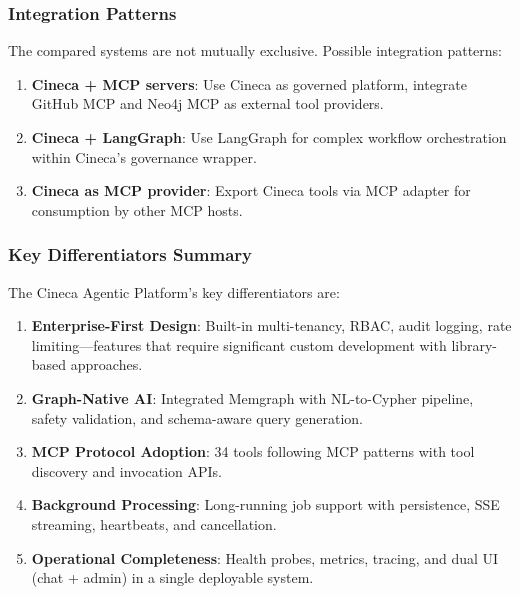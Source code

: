 \subsubsection{Integration Patterns}

The compared systems are not mutually exclusive. Possible integration patterns:

\begin{enumerate}
    \item \textbf{Cineca + MCP servers}: Use Cineca as governed platform, integrate GitHub MCP and Neo4j MCP as external tool providers.
    
    \item \textbf{Cineca + LangGraph}: Use LangGraph for complex workflow orchestration within Cineca's governance wrapper.
    
    \item \textbf{Cineca as MCP provider}: Export Cineca tools via MCP adapter for consumption by other MCP hosts.
\end{enumerate}

\subsubsection{Key Differentiators Summary}

The Cineca Agentic Platform's key differentiators are:

\begin{enumerate}
    \item \textbf{Enterprise-First Design}: Built-in multi-tenancy, RBAC, audit logging, rate limiting---features that require significant custom development with library-based approaches.
    
    \item \textbf{Graph-Native AI}: Integrated Memgraph with NL-to-Cypher pipeline, safety validation, and schema-aware query generation.
    
    \item \textbf{MCP Protocol Adoption}: 34 tools following MCP patterns with tool discovery and invocation APIs.
    
    \item \textbf{Background Processing}: Long-running job support with persistence, SSE streaming, heartbeats, and cancellation.
    
    \item \textbf{Operational Completeness}: Health probes, metrics, tracing, and dual UI (chat + admin) in a single deployable system.
\end{enumerate}

